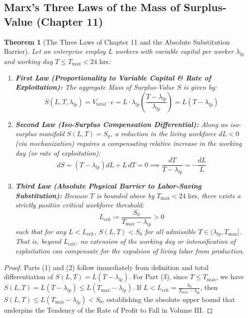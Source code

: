 \documentclass[11pt,a4paper]{article}
\newtheorem{theorem}{Theorem}[section]
\begin{document}
\subsection{Marx's Three Laws of the Mass of Surplus-Value (Chapter 11)}

\begin{theorem}[The Three Laws of Chapter 11 and the Absolute Substitution Barrier]
Let an enterprise employ $L$ workers with variable capital per worker $\lambda_{lp}$ and working day $T \le T_{\max} < 24\text{ hrs}$:
\begin{enumerate}[label=(\arabic*)]
    \item \textbf{First Law (Proportionality to Variable Capital \& Rate of Exploitation):} The aggregate Mass of Surplus-Value $S$ is given by:
    \begin{equation}
        S(L, T, \lambda_{lp}) = V_{\text{total}} \cdot e = L \cdot \lambda_{lp} \left(\frac{T - \lambda_{lp}}{\lambda_{lp}}\right) = L \left(T - \lambda_{lp}\right)
    \end{equation}
    \item \textbf{Second Law (Iso-Surplus Compensation Differential):} Along an iso-surplus manifold $S(L, T) = S_0$, a reduction in the living workforce $dL < 0$ (via mechanization) requires a compensating relative increase in the working day (or rate of exploitation):
    \begin{equation}
        dS = (T - \lambda_{lp}) dL + L \, dT = 0 \implies \frac{dT}{T - \lambda_{lp}} = -\frac{dL}{L}
    \end{equation}
    \item \textbf{Third Law (Absolute Physical Barrier to Labor-Saving Substitution):} Because $T$ is bounded above by $T_{\max} < 24\text{ hrs}$, there exists a strictly positive critical workforce threshold:
    \begin{equation}
        L_{\text{crit}} \coloneqq \frac{S_0}{T_{\max} - \lambda_{lp}} > 0
    \end{equation}
    such that for any $L < L_{\text{crit}}$, $S(L, T) < S_0$ for all admissible $T \in (\lambda_{lp}, T_{\max}]$. That is, beyond $L_{\text{crit}}$, no extension of the working day or intensification of exploitation can compensate for the expulsion of living labor from production.
\end{enumerate}
\end{theorem}

\begin{proof}
Parts (1) and (2) follow immediately from definition and total differentiation of $S(L, T) = L(T - \lambda_{lp})$. For Part (3), since $T \le T_{\max}$, we have $S(L, T) = L(T - \lambda_{lp}) \le L(T_{\max} - \lambda_{lp})$. If $L < L_{\text{crit}} = \frac{S_0}{T_{\max} - \lambda_{lp}}$, then $S(L, T) \le L(T_{\max} - \lambda_{lp}) < S_0$, establishing the absolute upper bound that underpins the Tendency of the Rate of Profit to Fall in Volume III.
\end{proof}
\newpage
\end{document}
